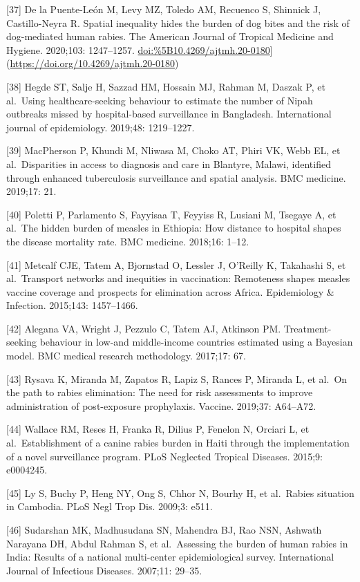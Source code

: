 \documentclass[
]{book}
\begin{document}
{[}37{]} De la Puente-León M, Levy MZ, Toledo AM, Recuenco S, Shinnick J,
Castillo-Neyra R. Spatial inequality hides the burden of dog bites and
the risk of dog-mediated human rabies. The American Journal of Tropical
Medicine and Hygiene. 2020;103: 1247--1257.
\url{doi:\%5B10.4269/ajtmh.20-0180}{]}(\url{https://doi.org/10.4269/ajtmh.20-0180})

{[}38{]} Hegde ST, Salje H, Sazzad HM, Hossain MJ, Rahman M, Daszak P, et
al.~Using healthcare-seeking behaviour to estimate the number of Nipah
outbreaks missed by hospital-based surveillance in Bangladesh.
International journal of epidemiology. 2019;48: 1219--1227.

{[}39{]} MacPherson P, Khundi M, Nliwasa M, Choko AT, Phiri VK, Webb EL, et
al.~Disparities in access to diagnosis and care in Blantyre, Malawi,
identified through enhanced tuberculosis surveillance and spatial
analysis. BMC medicine. 2019;17: 21.

{[}40{]} Poletti P, Parlamento S, Fayyisaa T, Feyyiss R, Lusiani M, Tsegaye
A, et al.~The hidden burden of measles in Ethiopia: How distance to
hospital shapes the disease mortality rate. BMC medicine. 2018;16:
1--12.

{[}41{]} Metcalf CJE, Tatem A, Bjornstad O, Lessler J, O'Reilly K, Takahashi
S, et al.~Transport networks and inequities in vaccination: Remoteness
shapes measles vaccine coverage and prospects for elimination across
Africa. Epidemiology \& Infection. 2015;143: 1457--1466.

{[}42{]} Alegana VA, Wright J, Pezzulo C, Tatem AJ, Atkinson PM.
Treatment-seeking behaviour in low-and middle-income countries estimated
using a Bayesian model. BMC medical research methodology. 2017;17: 67.

{[}43{]} Rysava K, Miranda M, Zapatos R, Lapiz S, Rances P, Miranda L, et
al.~On the path to rabies elimination: The need for risk assessments to
improve administration of post-exposure prophylaxis. Vaccine. 2019;37:
A64--A72.

{[}44{]} Wallace RM, Reses H, Franka R, Dilius P, Fenelon N, Orciari L, et
al.~Establishment of a canine rabies burden in Haiti through the
implementation of a novel surveillance program. PLoS Neglected Tropical
Diseases. 2015;9: e0004245.

{[}45{]} Ly S, Buchy P, Heng NY, Ong S, Chhor N, Bourhy H, et al.~Rabies
situation in Cambodia. PLoS Negl Trop Dis. 2009;3: e511.

{[}46{]} Sudarshan MK, Madhusudana SN, Mahendra BJ, Rao NSN, Ashwath
Narayana DH, Abdul Rahman S, et al.~Assessing the burden of human rabies
in India: Results of a national multi-center epidemiological survey.
International Journal of Infectious Diseases. 2007;11: 29--35.
\end{document}
